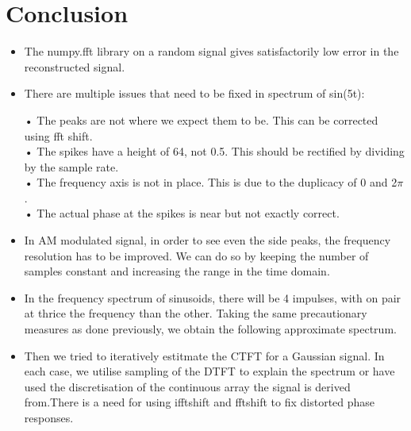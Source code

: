 \documentclass{article}
\begin{document}
\section{Conclusion}


\begin{itemize}
\item The numpy.fft library on a random signal gives satisfactorily low error in the reconstructed signal.
	
\item There are multiple issues that need to be fixed in spectrum of sin(5t):

	• The peaks are not where we expect them to be. This can be corrected
	using fft shift.\\
	• The spikes have a height of 64, not 0.5. This should be rectified by
	dividing by the sample rate.\\
	• The frequency axis is not in place. This is due to the duplicacy of 0
	and 2$\pi$.\\
	• The actual phase at the spikes is near but not exactly correct.

\item In AM modulated signal, in order to see even the side peaks, the frequency resolution has to be improved. We can do so by keeping the number of samples constant and increasing the range in the time domain.

\item In the frequency spectrum of sinusoids, there will be 4 impulses, with on pair
at thrice the frequency than the other. Taking the same precautionary
measures as done previously, we obtain the following approximate spectrum.

\item Then we tried to iteratively estitmate the CTFT for a Gaussian signal. In each case, we utilise sampling of the DTFT to explain the spectrum or have used the discretisation of the continuous array the signal is derived from.There is a need for using ifftshift and fftshift to fix distorted phase responses.

\end{itemize}
\end{document}
